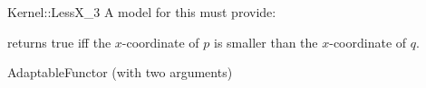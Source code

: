 \begin{ccRefFunctionObjectConcept}{Kernel::LessX_3}
A model for this must provide:


{returns true iff the $x$-coordinate of $p$ is smaller than the
$x$-coordinate of $q$.}

\ccRefines
AdaptableFunctor (with two arguments)

\ccSeeAlso
{}\\

\end{ccRefFunctionObjectConcept}
